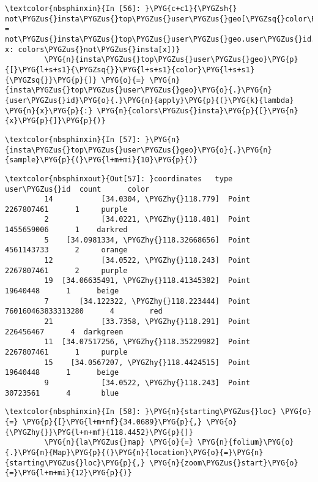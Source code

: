 \documentclass[letterpaper,10pt,english]{sphinxmanual}
\begin{document}
%
\begin{Verbatim}[commandchars=\\\{\}]
\textcolor{nbsphinxin}{In [56]: }\PYG{c+c1}{\PYGZsh{} not\PYGZus{}insta\PYGZus{}top\PYGZus{}user\PYGZus{}geo[\PYGZsq{}color\PYGZsq{}] = not\PYGZus{}insta\PYGZus{}top\PYGZus{}user\PYGZus{}geo.user\PYGZus{}id.apply(lambda x: colors\PYGZus{}not\PYGZus{}insta[x])}
         \PYG{n}{insta\PYGZus{}top\PYGZus{}user\PYGZus{}geo}\PYG{p}{[}\PYG{l+s+s1}{\PYGZsq{}}\PYG{l+s+s1}{color}\PYG{l+s+s1}{\PYGZsq{}}\PYG{p}{]} \PYG{o}{=} \PYG{n}{insta\PYGZus{}top\PYGZus{}user\PYGZus{}geo}\PYG{o}{.}\PYG{n}{user\PYGZus{}id}\PYG{o}{.}\PYG{n}{apply}\PYG{p}{(}\PYG{k}{lambda} \PYG{n}{x}\PYG{p}{:} \PYG{n}{colors\PYGZus{}insta}\PYG{p}{[}\PYG{n}{x}\PYG{p}{]}\PYG{p}{)}
\end{Verbatim}

%
\begin{Verbatim}[commandchars=\\\{\}]
\textcolor{nbsphinxin}{In [57]: }\PYG{n}{insta\PYGZus{}top\PYGZus{}user\PYGZus{}geo}\PYG{o}{.}\PYG{n}{sample}\PYG{p}{(}\PYG{l+m+mi}{10}\PYG{p}{)}
\end{Verbatim}

%
\begin{Verbatim}[commandchars=\\\{\}]
\textcolor{nbsphinxout}{Out[57]: }coordinates   type             user\PYGZus{}id  count      color
         14           [34.0304, \PYGZhy{}118.779]  Point          2267807461      1     purple
         2            [34.0221, \PYGZhy{}118.481]  Point          1455659006      1    darkred
         5    [34.0981334, \PYGZhy{}118.32668656]  Point          4561143733      2     orange
         12           [34.0522, \PYGZhy{}118.243]  Point          2267807461      2     purple
         19  [34.06635491, \PYGZhy{}118.41345382]  Point            19640448      1      beige
         7       [34.122322, \PYGZhy{}118.223444]  Point  760160463833313280      4        red
         21           [33.7358, \PYGZhy{}118.291]  Point           226456467      4  darkgreen
         11  [34.07517256, \PYGZhy{}118.35229982]  Point          2267807461      1     purple
         15    [34.0567207, \PYGZhy{}118.4424515]  Point            19640448      1      beige
         9            [34.0522, \PYGZhy{}118.243]  Point            30723561      4       blue
\end{Verbatim}

%
\begin{Verbatim}[commandchars=\\\{\}]
\textcolor{nbsphinxin}{In [58]: }\PYG{n}{starting\PYGZus{}loc} \PYG{o}{=} \PYG{p}{[}\PYG{l+m+mf}{34.0689}\PYG{p}{,} \PYG{o}{\PYGZhy{}}\PYG{l+m+mf}{118.4452}\PYG{p}{]}
         \PYG{n}{la\PYGZus{}map} \PYG{o}{=} \PYG{n}{folium}\PYG{o}{.}\PYG{n}{Map}\PYG{p}{(}\PYG{n}{location}\PYG{o}{=}\PYG{n}{starting\PYGZus{}loc}\PYG{p}{,} \PYG{n}{zoom\PYGZus{}start}\PYG{o}{=}\PYG{l+m+mi}{12}\PYG{p}{)}
\end{Verbatim}
\end{document}
